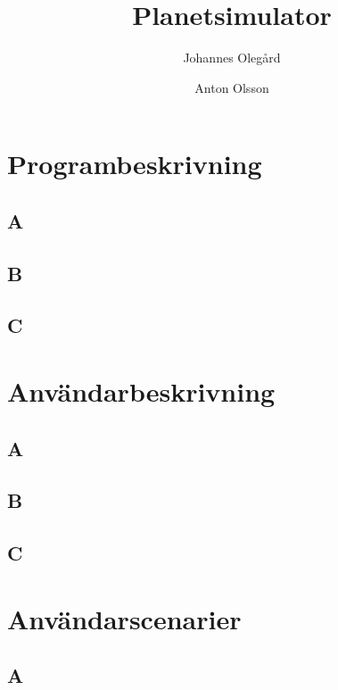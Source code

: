 \documentclass[a4paper, 11pt]{article}
\title{Planetsimulator}
\author{Johannes Olegård \and Anton Olsson}
\begin{document}
\maketitle

\section{Programbeskrivning}
\label{sec:progb}

\subsection{A}


\subsection{B}


\subsection{C}


\section{Användarbeskrivning}
\label{sec:anvb}

\subsection{A}


\subsection{B}


\subsection{C}


\section{Användarscenarier}
\label{sec:anvsc}

\subsection{A}

\end{document}
